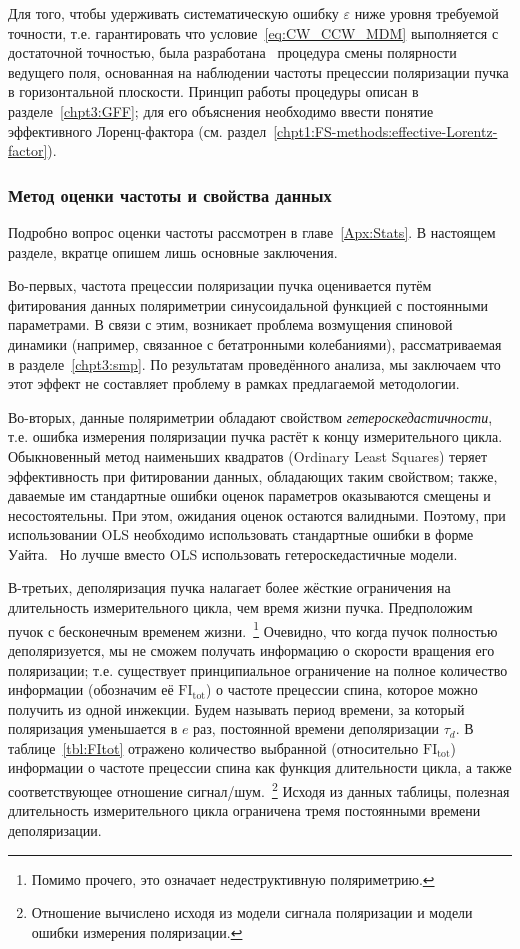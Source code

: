 Для того, чтобы удерживать систематическую ошибку $\varepsilon$ ниже уровня требуемой точности, т.е. гарантировать что условие~\eqref{eq:CW_CCW_MDM} выполняется с достаточной точностью, была разработана~\cite{Senichev:FDM} процедура смены полярности ведущего поля,
основанная на наблюдении частоты прецессии поляризации пучка в горизонтальной плоскости. 
Принцип работы процедуры описан в разделе~\ref{chpt3:GFF}; для его объяснения необходимо ввести понятие эффективного Лоренц-фактора (см. раздел~\ref{chpt1:FS-methods:effective-Lorentz-factor}).

\subsubsection{Метод оценки частоты и  свойства данных}
Подробно вопрос оценки частоты рассмотрен в главе~\ref{Apx:Stats}. 
В настоящем разделе, вкратце опишем лишь основные заключения.

Во-первых, частота прецессии поляризации пучка оценивается путём 
фитирования данных поляриметрии синусоидальной функцией с постоянными параметрами. 
В связи с этим, возникает проблема возмущения спиновой динамики (например, 
связанное с бетатронными колебаниями), рассматриваемая в разделе~\ref{chpt3:smp}. 
По результатам проведённого анализа, мы заключаем что этот эффект 
не составляет проблему в рамках предлагаемой методологии.

Во-вторых, данные поляриметрии обладают свойством \emph{гетероскедастичности}, 
т.е. ошибка измерения поляризации пучка растёт к концу измерительного цикла.~\cite{Eversmann:Thesis}
Обыкновенный метод наименьших квадратов (Ordinary Least Squares) теряет эффективность 
при фитировании данных, обладающих таким свойством; также, даваемые им стандартные ошибки 
оценок параметров оказываются смещены и несостоятельны. При этом, ожидания оценок 
остаются валидными. Поэтому, при использовании OLS необходимо использовать стандартные ошибки 
в форме Уайта.~\cite{Stats:White:Robust-estimator} Но лучше вместо OLS использовать 
гетероскедастичные модели.~\cite{Stats:R:NLREG, Stats:HeteroskedasticNRM}

В-третьих, деполяризация пучка налагает более жёсткие ограничения на длительность измерительного цикла, 
чем время жизни пучка. Предположим пучок с бесконечным временем жизни.~\footnote{Помимо прочего, 
	это означает недеструктивную поляриметрию.} Очевидно, что когда пучок полностью деполяризуется, 
мы не сможем получать информацию о скорости вращения его поляризации; т.е. 
существует принципиальное ограничение на полное количество информации (обозначим её $\mathrm{FI_{tot}}$) 
о частоте прецессии спина, которое можно получить из одной инжекции. Будем называть период времени, 
за который поляризация уменьшается в $e$ раз, постоянной времени деполяризации $\tau_d$. 
В таблице~\ref{tbl:FItot} отражено количество выбранной (относительно $\mathrm{FI_{tot}}$) информации 
о частоте прецессии спина как функция длительности цикла, а также соответствующее отношение
сигнал/шум.~\footnote{Отношение вычислено исходя из модели сигнала поляризации и 
	модели ошибки измерения поляризации.} Исходя из данных таблицы, полезная 
длительность измерительного цикла ограничена тремя постоянными времени деполяризации.

